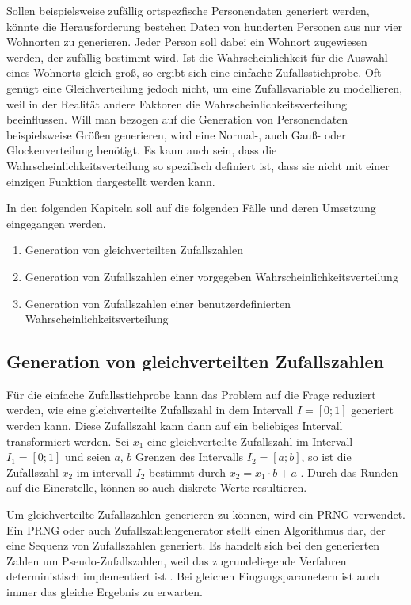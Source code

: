 Sollen beispielsweise zufällig ortspezfische Personendaten generiert werden, könnte die Herausforderung bestehen Daten von hunderten Personen aus nur vier Wohnorten zu generieren. Jeder Person soll dabei ein Wohnort zugewiesen werden, der zufällig bestimmt wird. Ist die Wahrscheinlichkeit für die Auswahl eines Wohnorts gleich groß, so ergibt sich eine einfache Zufallsstichprobe. Oft genügt eine Gleichverteilung jedoch nicht, um eine Zufallsvariable zu modellieren, weil in der Realität andere Faktoren die Wahrscheinlichkeitsverteilung beeinflussen. Will man bezogen auf die Generation von Personendaten beispielsweise Größen generieren, wird eine Normal-, auch Gauß- oder Glockenverteilung benötigt. Es kann auch sein, dass die Wahrscheinlichkeitsverteilung so spezifisch definiert ist, dass sie nicht mit einer einzigen Funktion dargestellt werden kann.

In den folgenden Kapiteln soll auf die folgenden Fälle und deren Umsetzung eingegangen werden.
\begin{enumerate}
    \item Generation von gleichverteilten Zufallszahlen
    \item Generation von Zufallszahlen einer vorgegeben Wahrscheinlichkeitsverteilung
    \item Generation von Zufallszahlen einer benutzerdefinierten Wahrscheinlichkeitsverteilung
\end{enumerate}

\subsection{Generation von gleichverteilten Zufallszahlen}

Für die einfache Zufallsstichprobe kann das Problem auf die Frage reduziert werden, wie eine gleichverteilte Zufallszahl in dem Intervall $I=[0;1]$ generiert werden kann. Diese Zufallszahl kann dann auf ein beliebiges Intervall transformiert werden. Sei $x_1$ eine gleichverteilte Zufallszahl im Intervall $I_1=[0;1]$ und seien $a$, $b$ Grenzen des Intervalls $I_2=[a;b]$, so ist die Zufallszahl $x_2$ im intervall $I_2$ bestimmt durch $x_2=x_1 \cdot b+a$ \cite{prng}. Durch das Runden auf die Einerstelle, können so auch diskrete Werte resultieren.

Um gleichverteilte Zufallszahlen generieren zu können, wird ein \ac{PRNG} verwendet. Ein \ac{PRNG} oder auch Zufallszahlengenerator stellt einen Algorithmus dar, der eine Sequenz von Zufallszahlen generiert. Es handelt sich bei den generierten Zahlen um Pseudo-Zufallszahlen, weil das zugrundeliegende Verfahren deterministisch implementiert ist \cite{prng}. Bei gleichen Eingangsparametern ist auch immer das gleiche Ergebnis zu erwarten. 

